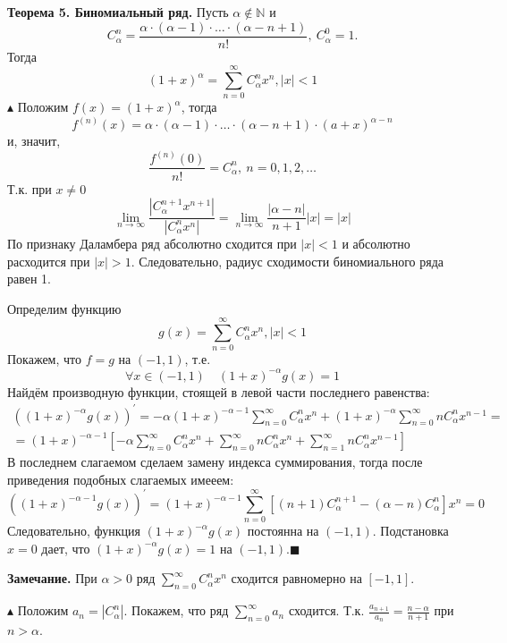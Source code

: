 \documentclass{article}
\begin{document}
\textbf{Теорема 5. Биномиальный ряд.}
Пусть $\alpha \notin \mathbb{N}$ и
$$C_{\alpha}^n=\frac{\alpha\cdot(\alpha - 1)\cdot\ldots\cdot(\alpha - n + 1)}{n!}, \:  C_{\alpha}^0=1.$$
Тогда $$(1+x)^{\alpha}=\sum_{n=0}^\infty C_{\alpha}^{n}x^n, |x|<1$$
$\blacktriangle$ Положим $f(x)=(1+x)^\alpha$, тогда$$f^{(n)}(x)=\alpha\cdot(\alpha-1)\cdot\ldots\cdot(\alpha-n+1)\cdot(a+x)^{\alpha-n}$$и, значит,$$\frac{f^{(n)}(0)}{n!}=C_{\alpha}^{n}, \: n =0, 1, 2, \ldots$$Т.к. при $x\neq0$ $$\lim_{n\to\infty}\frac{|C_{\alpha}^{n+1}x^{n+1}|}{|C_{\alpha}^{n}x^n|} = \lim_{n \to \infty}\frac{|\alpha-n|}{n+1}|x|=|x|$$По признаку Даламбера ряд абсолютно сходится при $|x|<1$ и абсолютно расходится при $|x|>1$. Следовательно, радиус сходимости биномиального ряда равен 1.

Определим функцию $$g(x)=\sum_{n=0}^{\infty}C_{\alpha}^{n}x^n, |x|<1$$
Покажем, что $f=g$ на $(-1, 1)$, т.е. $$\forall x\in(-1, 1) \quad (1+x)^{-\alpha}g(x)=1$$
Найдём производную функции, стоящей в левой части последнего равенства:
\begin{eqnarray*}
\left((1+x)^{-\alpha}g(x)\right)^{\prime}=-\alpha(1+x)^{-\alpha-1}\sum_{n=0}^{\infty}C_{\alpha}^{n}x^n+(1+x)^{-\alpha}\sum_{n=0}^{\infty}n C_{\alpha}^{n}x^{n-1}=\\=(1+x)^{-\alpha-1}\left[-\alpha\sum_{n=0}^{\infty}C_{\alpha}^{n}x^n+\sum_{n=0}^{\infty}n C_{\alpha}^n x^n+\sum_{n=1}^{\infty}n C_{\alpha}^{n}x^{n-1}\right]
\end{eqnarray*}
В последнем слагаемом сделаем замену индекса суммирования, тогда после приведения подобных слагаемых имееем:
$$\left((1+x)^{-\alpha-1}g(x)\right)^{\prime}=(1+x)^{-\alpha-1}\sum_{n=0}^{\infty}\left[(n+1)C_{\alpha}^{n+1}-(\alpha-n)C_{\alpha}^{n}\right]x^n=0$$
Следовательно, функция $(1+x)^{-\alpha}g(x)$ постоянна на $(-1, 1)$. Подстановка $x=0$ дает, что $(1+x)^{-\alpha}g(x)=1$ на $(-1, 1)$.\:$\blacksquare$

\textbf{Замечание.} При $\alpha>0$ ряд $\sum_{n=0}^{\infty}C_{\alpha}^{n}x^n$ сходится равномерно на $[-1, 1]$.

$\blacktriangle$ Положим $a_n=|C_{\alpha}^n|$. Покажем, что ряд $\sum_{n=0}^{\infty}a_n$ сходится. Т.к. $\frac{a_{n+1}}{a_{n}}=\frac{n-\alpha}{n+1}$ при $n>\alpha$.
\end{document}
